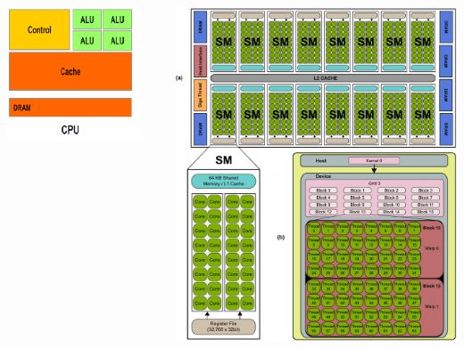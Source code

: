 \documentclass[aspectratio=169,compress]{beamer}
\begin{document}
{\begin{columns}
\begin{column}{0.19\textwidth}
\begin{center}
\includegraphics[width=0.9\textwidth]{FigsOpenGL/CPU}\\
\end{center}
\end{column}
\begin{column}{0.30\textwidth}  
    \begin{center}
     \includegraphics[width=\textwidth]{FigsOpenGL/Typical-NVIDIA-GPU-architecture}
     \end{center}
\end{column}
\end{columns}
}
\end{document}
